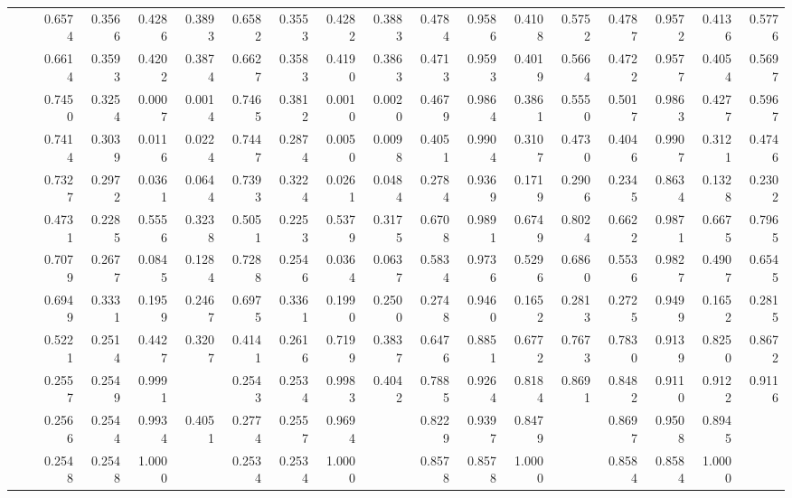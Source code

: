 \begin{table*}[t]
{\begin{tabular}{|l|l|r|r|r|r|r|r|r|r|r|r|r|r|r|r|r|r|}
			
			\multirow{11}{*}{\rotatebox{90}{\Reddit}} 
			&\ATC       & 0.6574 & 0.3566 & 0.4286 & 0.3893 & 0.6582 & 0.3553 & 0.4282 & 0.3883 & 0.4784 & 0.9586 & 0.4108 & 0.5752 & 0.4787 & 0.9572 & 0.4136 & 0.5776 \\
			&\CTC       & 0.6614 & 0.3593 & 0.4202 & 0.3874 & 0.6627 & 0.3583 & 0.4190 & 0.3863 & 0.4713 & 0.9593 & 0.4019 & 0.5664 & 0.4722 & 0.9577 & 0.4054 & 0.5697 \\\cline{2-18}
			&\MAML      & 0.7450 & 0.3254 & 0.0007 & 0.0014 & 0.7465 & 0.3812 & 0.0010 & 0.0020 & 0.4679 & 0.9864 & 0.3861 & 0.5550 & 0.5017 & 0.9863 & 0.4277 & 0.5967 \\
			&\Reptile   & 0.7414 & 0.3039 & 0.0116 & 0.0224 & 0.7447 & 0.2874 & 0.0050 & 0.0098 & 0.4051 & 0.9904 & 0.3107 & 0.4730 & 0.4046 & 0.9907 & 0.3121 & 0.4746 \\
			&\Featrans  & 0.7327 & 0.2972 & 0.0361 & 0.0644 & 0.7393 & 0.3224 & 0.0261 & 0.0484 & 0.2784 & 0.9369 & 0.1719 & 0.2906 & 0.2345 & 0.8634 & 0.1328 & 0.2302 \\
			&\PN        & 0.4731 & 0.2285 & 0.5556 & 0.3238 & 0.5051 & 0.2253 & 0.5379 & 0.3175 & 0.6708 &0.9891 &0.6749 &0.8024 & 0.6622 &0.9871 &0.6675 &0.7965 \\\cline{2-18}
			&\Supervise & 0.7079 & 0.2677 & 0.0845 & 0.1284 & 0.7288 & 0.2546 & 0.0364 & 0.0637 & 0.5834 & 0.9736 & 0.5296 & 0.6860 & 0.5536 & 0.9827 & 0.4907 & 0.6545 \\
			&\ICSGNN    & 0.6949 & 0.3331 & 0.1959 & 0.2467 & 0.6975 & 0.3361 & 0.1990 & 0.2500 & 0.2748 & 0.9460 & 0.1652 & 0.2813 & 0.2725 & 0.9499 & 0.1652 & 0.2815 \\
			&\AQDGNN    & 0.5221 & 0.2514 & 0.4427 & 0.3207 & 0.4141 & 0.2616 & 0.7199 & 0.3837 & 0.6476 & 0.8851 & 0.6772 & 0.7673 & 0.7830 & 0.9139 & 0.8250 & 0.8672 \\\cline{2-18}
			&\CGNPIP    & 0.2557 & 0.2549 & 0.9991 & \cellcolor{LightRed}{0.4062} & 0.2543 & 0.2534 & 0.9983 & 0.4042 & 0.7885 & 0.9264 & 0.8184 & 0.8691 & 0.8482 & 0.9110 & 0.9122 & 0.9116 \\
			&\CGNPMLP   & 0.2566 & 0.2544 & 0.9934 & 0.4051 & 0.2774 & 0.2557 & 0.9694 & \cellcolor{LightRed}{0.4047} & 0.8229 & 0.9397 & 0.8479 & \cellcolor{LightCyan}{0.8915} & 0.8697 & 0.9508 & 0.8945 & \cellcolor{LightRed}{0.9218} \\
			&\CGNPGNN   & 0.2548 & 0.2548 & 1.0000 & \cellcolor{LightCyan}{0.4061} & 0.2534 & 0.2534 & 1.0000 & \cellcolor{LightCyan}{0.4043} & 0.8578 & 0.8578 & 1.0000 & \cellcolor{LightRed}{0.9235} & 0.8584 & 0.8584 & 1.0000 & \cellcolor{LightCyan}{0.9238}\\\hline\hline
			

\end{tabular}}
\end{table*}
